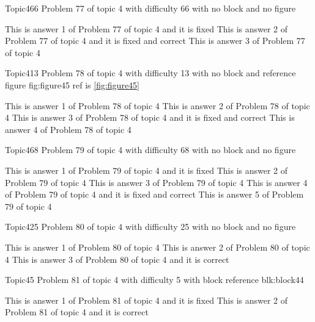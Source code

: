 \documentclass[master]{exam}
\begin{document}
\begin{problem}{Topic4}{66}
	Problem 77 of topic 4 with difficulty 66 with no block and no figure
	\begin{answers}
		\answer[fixed] This is answer 1 of Problem 77 of topic 4 and it is fixed
		 This is answer 2 of Problem 77 of topic 4 and it is fixed and correct
		\answer This is answer 3 of Problem 77 of topic 4 
	\end{answers}
\end{problem}

\begin{problem}{Topic4}{13}
	Problem 78 of topic 4 with difficulty 13 with no block and reference figure fig:figure45 ref is \ref{fig:figure45}
	\begin{answers}
		\answer This is answer 1 of Problem 78 of topic 4 
		\answer This is answer 2 of Problem 78 of topic 4 
		 This is answer 3 of Problem 78 of topic 4 and it is fixed and correct
		\answer This is answer 4 of Problem 78 of topic 4 
	\end{answers}
\end{problem}

\begin{problem}{Topic4}{68}
	Problem 79 of topic 4 with difficulty 68 with no block and no figure
	\begin{answers}
		\answer[fixed] This is answer 1 of Problem 79 of topic 4 and it is fixed
		\answer This is answer 2 of Problem 79 of topic 4 
		\answer This is answer 3 of Problem 79 of topic 4 
		 This is answer 4 of Problem 79 of topic 4 and it is fixed and correct
		\answer This is answer 5 of Problem 79 of topic 4 
	\end{answers}
\end{problem}

\begin{problem}{Topic4}{25}
	Problem 80 of topic 4 with difficulty 25 with no block and no figure
	\begin{answers}
		\answer This is answer 1 of Problem 80 of topic 4 
		\answer This is answer 2 of Problem 80 of topic 4 
		\answer[correct] This is answer 3 of Problem 80 of topic 4 and it is correct
	\end{answers}
\end{problem}

\begin{problem}[requires=blk:block44]{Topic4}{5}
	Problem 81 of topic 4 with difficulty 5 with block reference blk:block44
	\begin{answers}
		\answer[fixed] This is answer 1 of Problem 81 of topic 4 and it is fixed
		\answer[correct] This is answer 2 of Problem 81 of topic 4 and it is correct
	\end{answers}
\end{problem}
\end{document}

